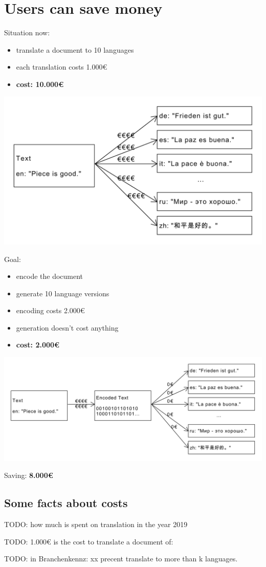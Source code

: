 \documentclass{article}
\begin{document}
\section{Users can save money}

Situation now:
\begin{itemize}
\item translate a document to 10 languages
\item each translation costs 1.000€
\item \textbf{cost: 10.000€}
\end{itemize}

\includegraphics[scale=0.4]{dia/user-view-current-world.pdf}

Goal:
\begin{itemize}
\item encode the document
\item generate 10 language versions
\item encoding costs 2.000€
\item generation doesn't cost anything
\item \textbf{cost: 2.000€}
\end{itemize}

\includegraphics[scale=0.4]{dia/user-view-tokimani.pdf}

Saving: \textbf{8.000€}

\subsection{Some facts about costs}
TODO: how much is spent on translation in the year 2019

TODO: 1.000€ is the cost to translate a document of: 

TODO: in Branchenkennz: xx precent translate to more than k languages.
\end{document}
